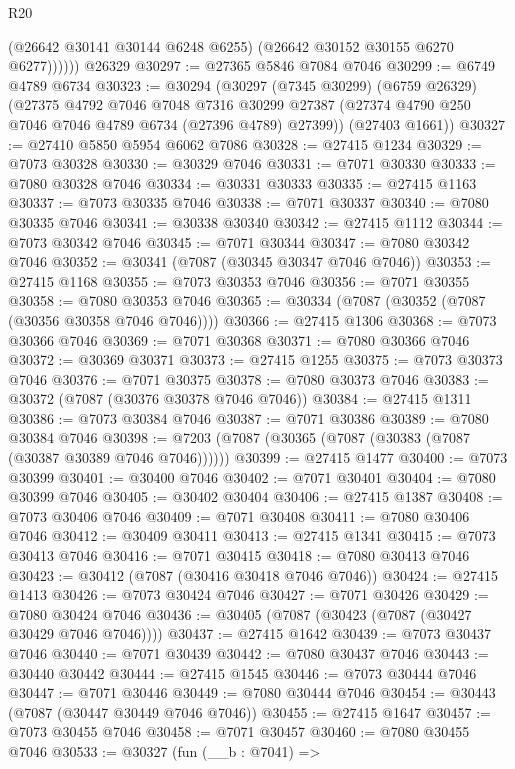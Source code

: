 \begin{lexlean}{R20}
\begin{coremodule}
{              (@26642 @30141 @30144 @6248 @6255)
              (@26642 @30152 @30155 @6270 @6277))))))
    @26329
@30297 := @27365 @5846 @7084 @7046
@30299 := @6749 @4789 @6734
@30323 := @30294
    (@30297
      (@7345 @30299)
      (@6759 @26329)
      (@27375
        @4792
        @7046
        @7048
        @7316
        @30299
        @27387
        (@27374 @4790 @250 @7046 @7046 @4789 @6734 (@27396 @4789) @27399))
      (@27403 @1661))
@30327 := @27410 @5850 @5954 @6062 @7086
@30328 := @27415 @1234
@30329 := @7073 @30328
@30330 := @30329 @7046
@30331 := @7071 @30330
@30333 := @7080 @30328 @7046
@30334 := @30331 @30333
@30335 := @27415 @1163
@30337 := @7073 @30335 @7046
@30338 := @7071 @30337
@30340 := @7080 @30335 @7046
@30341 := @30338 @30340
@30342 := @27415 @1112
@30344 := @7073 @30342 @7046
@30345 := @7071 @30344
@30347 := @7080 @30342 @7046
@30352 := @30341 (@7087 (@30345 @30347 @7046 @7046))
@30353 := @27415 @1168
@30355 := @7073 @30353 @7046
@30356 := @7071 @30355
@30358 := @7080 @30353 @7046
@30365 := @30334 (@7087 (@30352 (@7087 (@30356 @30358 @7046 @7046))))
@30366 := @27415 @1306
@30368 := @7073 @30366 @7046
@30369 := @7071 @30368
@30371 := @7080 @30366 @7046
@30372 := @30369 @30371
@30373 := @27415 @1255
@30375 := @7073 @30373 @7046
@30376 := @7071 @30375
@30378 := @7080 @30373 @7046
@30383 := @30372 (@7087 (@30376 @30378 @7046 @7046))
@30384 := @27415 @1311
@30386 := @7073 @30384 @7046
@30387 := @7071 @30386
@30389 := @7080 @30384 @7046
@30398 := @7203 (@7087 (@30365 (@7087 (@30383 (@7087 (@30387 @30389 @7046 @7046))))))
@30399 := @27415 @1477
@30400 := @7073 @30399
@30401 := @30400 @7046
@30402 := @7071 @30401
@30404 := @7080 @30399 @7046
@30405 := @30402 @30404
@30406 := @27415 @1387
@30408 := @7073 @30406 @7046
@30409 := @7071 @30408
@30411 := @7080 @30406 @7046
@30412 := @30409 @30411
@30413 := @27415 @1341
@30415 := @7073 @30413 @7046
@30416 := @7071 @30415
@30418 := @7080 @30413 @7046
@30423 := @30412 (@7087 (@30416 @30418 @7046 @7046))
@30424 := @27415 @1413
@30426 := @7073 @30424 @7046
@30427 := @7071 @30426
@30429 := @7080 @30424 @7046
@30436 := @30405 (@7087 (@30423 (@7087 (@30427 @30429 @7046 @7046))))
@30437 := @27415 @1642
@30439 := @7073 @30437 @7046
@30440 := @7071 @30439
@30442 := @7080 @30437 @7046
@30443 := @30440 @30442
@30444 := @27415 @1545
@30446 := @7073 @30444 @7046
@30447 := @7071 @30446
@30449 := @7080 @30444 @7046
@30454 := @30443 (@7087 (@30447 @30449 @7046 @7046))
@30455 := @27415 @1647
@30457 := @7073 @30455 @7046
@30458 := @7071 @30457
@30460 := @7080 @30455 @7046
@30533 := @30327
    (fun (__b : @7041) =>
}
\end{coremodule}
\end{lexlean}

